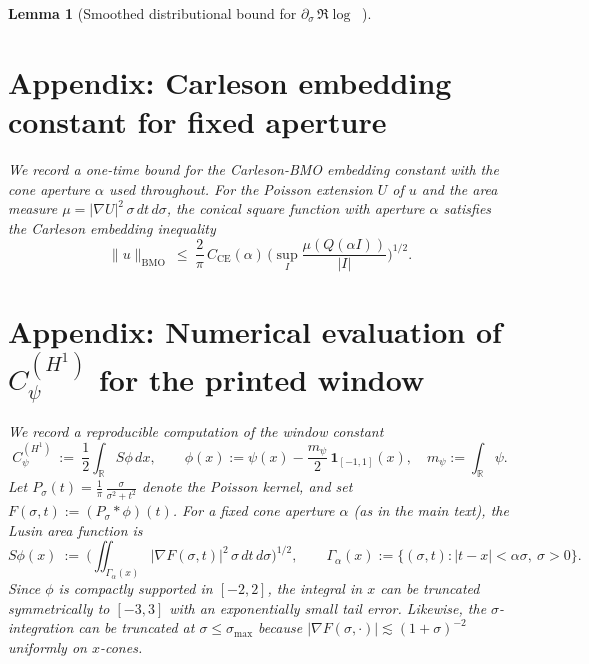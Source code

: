 \documentclass[11pt]{article}
\newtheorem{lemma}[theorem]{Lemma}
\theoremstyle{definition}
\theoremstyle{remark}
\newcommand{\R}{\mathbb{R}}
\DeclareMathOperator{\dettwo}{det_2}
\begin{document}
\begin{lemma}[Smoothed distributional bound for $\partial_\sigma\,\Re\log\dettwo$]
\section{Appendix: Carleson embedding constant for fixed aperture}\label{app:CE-constant}
We record a one-time bound for the Carleson-BMO embedding constant with the cone aperture $\alpha$ used throughout. For the Poisson extension $U$ of $u$ and the area measure $\mu=|\nabla U|^2\,\sigma\,dt\,d\sigma$, the conical square function with aperture $\alpha$ satisfies the Carleson embedding inequality
\[
  \|u\|_{\mathrm{BMO}}\ \le\ \frac{2}{\pi}\,C_{\mathrm{CE}}(\alpha)\,\Big(\sup_I \frac{\mu(Q(\alpha I))}{|I|}\Big)^{\!1/2}.
\]
\section{Appendix: Numerical evaluation of $C_\psi^{(H^1)}$ for the printed window}\label{app:Cpsi-compute}
We record a reproducible computation of the window constant
\[
  C_\psi^{(H^1)}\ :=\ \frac12\int_{\R} S\phi\,dx,\qquad \phi(x):=\psi(x)-\frac{m_\psi}{2}\,\mathbf 1_{[-1,1]}(x),\quad m_\psi:=\int_\R\psi.
\]
Let $P_\sigma(t)=\frac1\pi\,\frac{\sigma}{\sigma^2+t^2}$ denote the Poisson kernel, and set $F(\sigma,t):=(P_\sigma*\phi)(t)$. For a fixed cone aperture $\alpha$ (as in the main text), the Lusin area function is
\[
  S\phi(x)\ :=\ \Big(\iint_{\Gamma_\alpha(x)} |\nabla F(\sigma,t)|^2\,\sigma\,dt\,d\sigma\Big)^{\!1/2},\qquad \Gamma_\alpha(x):=\{(\sigma,t):|t-x|<\alpha\sigma,\ \sigma>0\}.
\]
Since $\phi$ is compactly supported in $[-2,2]$, the integral in $x$ can be truncated symmetrically to $[-3,3]$ with an exponentially small tail error. Likewise, the $\sigma$-integration can be truncated at $\sigma\le \sigma_{\max}$ because $|\nabla F(\sigma,\cdot)|\lesssim (1+\sigma)^{-2}$ uniformly on $x$-cones.


\end{lemma}
\end{document}
